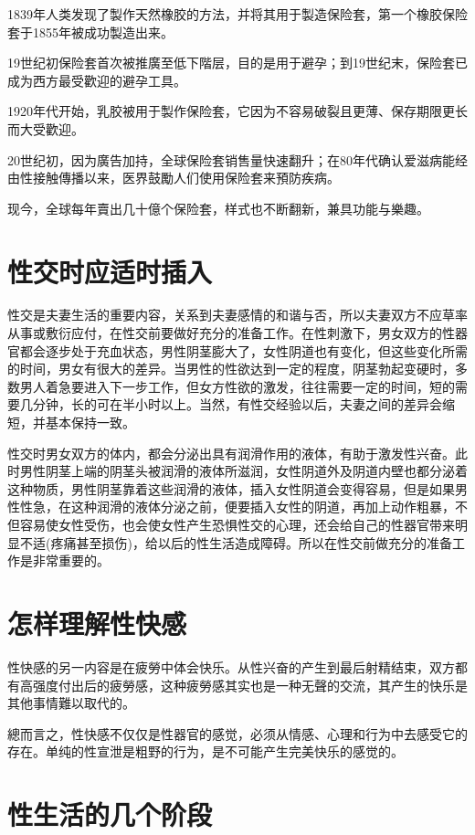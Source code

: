 \documentclass[12pt,UTF8]{ctexbook}
\begin{document}
1839年人类发现了製作天然橡胶的方法，并将其用于製造保险套，第一个橡胶保险套于1855年被成功製造出来。

19世纪初保险套首次被推廣至低下階层，目的是用于避孕；到19世纪末，保险套已成为西方最受歡迎的避孕工具。

1920年代开始，乳胶被用于製作保险套，它因为不容易破裂且更薄、保存期限更长而大受歡迎。

20世纪初，因为廣告加持，全球保险套销售量快速翻升；在80年代确认爱滋病能经由性接触傳播以来，医界鼓勵人们使用保险套来預防疾病。

现今，全球每年賣出几十億个保险套，样式也不断翻新，兼具功能与樂趣。



\section{性交时应适时插入}

性交是夫妻生活的重要内容，关系到夫妻感情的和谐与否，所以夫妻双方不应草率从事或敷衍应付，在性交前要做好充分的准备工作。在性刺激下，男女双方的性器官都会逐步处于充血状态，男性阴茎膨大了，女性阴道也有变化，但这些变化所需的时间，男女有很大的差异。当男性的性欲达到一定的程度，阴茎勃起变硬时，多数男人着急要进入下一步工作，但女方性欲的激发，往往需要一定的时间，短的需要几分钟，长的可在半小时以上。当然，有性交经验以后，夫妻之间的差异会缩短，并基本保持一致。

性交时男女双方的体内，都会分泌出具有润滑作用的液体，有助于激发性兴奋。此时男性阴茎上端的阴茎头被润滑的液体所滋润，女性阴道外及阴道内壁也都分泌着这种物质，男性阴茎靠着这些润滑的液体，插入女性阴道会变得容易，但是如果男性性急，在这种润滑的液体分泌之前，便要插入女性的阴道，再加上动作粗暴，不但容易使女性受伤，也会使女性产生恐惧性交的心理，还会给自己的性器官带来明显不适(疼痛甚至损伤)，给以后的性生活造成障碍。所以在性交前做充分的准备工作是非常重要的。

\section{怎样理解性快感}

性快感的另一内容是在疲勞中体会快乐。从性兴奋的产生到最后射精结束，双方都有高强度付出后的疲勞感，这种疲勞感其实也是一种无聲的交流，其产生的快乐是其他事情難以取代的。

總而言之，性快感不仅仅是性器官的感觉，必须从情感、心理和行为中去感受它的存在。单纯的性宣泄是粗野的行为，是不可能产生完美快乐的感觉的。

\section{性生活的几个阶段}
\end{document}
